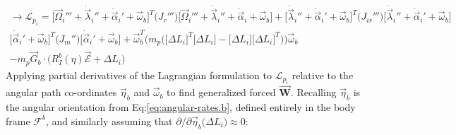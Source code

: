\begin{multline}
\rightarrow\mathcal{L}_{p_i}=\Big[\vec{\Omega}_i'''+\dot{\vec{\lambda}}_i''+\dot{\vec{\alpha}}_i'+\vec{\omega}_b\Big]^T\big(J_r'''\big)\Big[\vec{\Omega}_i'''+\dot{\vec{\lambda}}_i''+\dot{\vec{\alpha}}_i+\vec{\omega}_b\Big]+\Big[\dot{\vec{\lambda}}_i''+\dot{\vec{\alpha}}_i'+\vec{\omega}_b\Big]^T\big(J_{ir}'''\big)\Big[\dot{\vec{\lambda}}_i''+\dot{\vec{\alpha}}_i'+\vec{\omega}_b\Big]
\\
\Big[\dot{\vec{\alpha}}_i'+\vec{\omega}_b\Big]^T\big(J_m''\big)\Big[\dot{\vec{\alpha}}_i'+\vec{\omega}_b\Big]+\vec{\omega}_{b}^T\big(m_p\Big(\big[\Delta L_i\big]^T\big[\Delta L_i\big]-\big[\Delta L_i\big]\big[\Delta L_i\big]^T\Big)\big)\vec{\omega}_{b}
\\
-m_p\vec{G}_b\cdot\big(R_I^b(\eta)\vec{\mathcal{E}}+\Delta L_i\big)
\end{multline}
Applying partial derivatives of the Lagrangian formulation to $\mathcal{L}_{p_i}$ relative to the angular path co-ordinates $\vec{\eta}_b$ and $\vec{\omega}_b$ to find generalized forced $\vec{\mathbf{W}}$. Recalling $\vec{\eta}_b$ is the angular orientation from Eq:\ref{eq:angular-rates.b}, defined entirely in the body frame $\mathcal{F}^b$, and similarly assuming that $\partial/\partial\vec{\eta}_b\big(\Delta L_i\big)\approx 0$:
